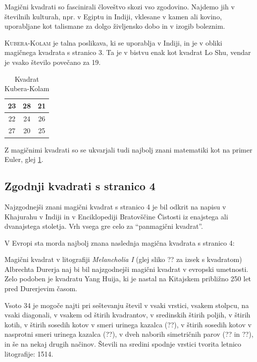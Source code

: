\documentclass[a4paper,12pt]{article}
\newcommand{\pojem}[1]{\textsc{#1}}
\begin{document}
Magični kvadrati so fascinirali človeštvo skozi vso zgodovino. Najdemo jih
v številnih kulturah, npr. v Egiptu in Indiji, vklesane v kamen ali
kovino, uporabljane kot talismane za dolgo življensko dobo in v
izogib boleznim.

\pojem{Kubera-Kolam} je talna poslikava, ki se uporablja v Indiji, in je v
obliki magičnega kvadrata s stranico 3. Ta je v bistvu enak kot kvadrat
Lo Shu, vendar je vsako število povečano za 19.
\begin{table}[!h]
\centering
\caption{Kvadrat Kubera-Kolam}
\vspace{2mm}
\label{KKK}
\begin{tabular}{|c|c|c|}
\hline
23&28&21 \\ \hline
22&24&26 \\ \hline
27&20&25 \\ \hline
\end{tabular}
\end{table}


Z magičnimi kvadrati so se ukvarjali tudi najbolj znani matematiki kot na
primer Euler, glej \ref{KKK}.

\subsection{Zgodnji kvadrati s stranico 4}


Najzgodnejši znani magični kvadrat s stranico 4 je bil odkrit na napisu
v Khajurahu v Indiji in v Enciklopediji Bratovščine Čistosti iz enajstega
ali dvanajstega stoletja. Vrh vsega gre celo za "`panmagični kvadrat"'.

V Evropi sta morda najbolj znana naslednja magična kvadrata s stranico 4:

Magični kvadrat v litografiji \emph{Melancholia I} (glej sliko ??
za izsek s kvadratom) Albrechta Durerja naj bi bil najzgodnejši magični kvadrat
v evropski umetnosti. Zelo podoben je kvadratu Yang Huija, ki je nastal na Kitajskem
približno 250 let pred Durerjevim časom.

Vsoto 34 je mogoče najti pri seštevanju števil v vsaki vrstici, vsakem stolpcu,
na vsaki diagonali, v vsakem od štirih kvadrantov, v sredinskih štirih poljih,
v štirih kotih, v štirih sosedih kotov v smeri urinega kazalca (??), v
štirih sosedih kotov v nasprotni smeri urinega kazalca (??), v dveh naborih
simetričnih parov (?? in ??), in še na nekaj drugih načinov.
Števili na sredini spodnje vrstici tvorita letnico litografije: 1514.
\end{document}
